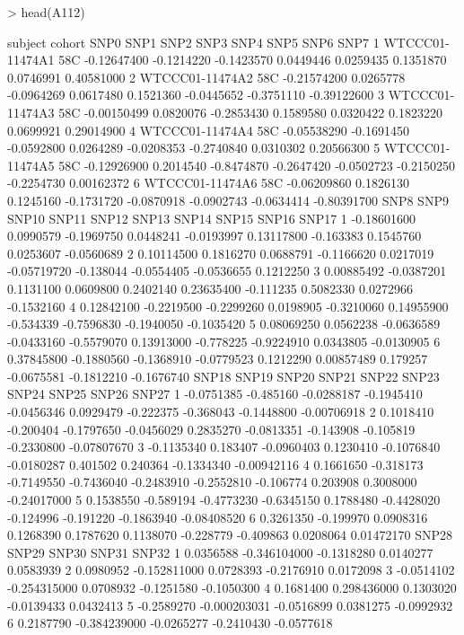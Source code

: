 \documentclass[11pt]{article}
\begin{document}
\begin{Schunk}
\begin{Sinput}
> head(A112)
\end{Sinput}
\end{Schunk}
\tiny
\begin{Schunk}
\begin{Soutput}
          subject cohort        SNP0       SNP1       SNP2       SNP3       SNP4       SNP5       SNP6        SNP7
1 WTCCC01-11474A1    58C -0.12647400 -0.1214220 -0.1423570  0.0449446  0.0259435  0.1351870  0.0746991  0.40581000
2 WTCCC01-11474A2    58C -0.21574200  0.0265778 -0.0964269  0.0617480  0.1521360 -0.0445652 -0.3751110 -0.39122600
3 WTCCC01-11474A3    58C -0.00150499  0.0820076 -0.2853430  0.1589580  0.0320422  0.1823220  0.0699921  0.29014900
4 WTCCC01-11474A4    58C -0.05538290 -0.1691450 -0.0592800  0.0264289 -0.0208353 -0.2740840  0.0310302  0.20566300
5 WTCCC01-11474A5    58C -0.12926900  0.2014540 -0.8474870 -0.2647420 -0.0502723 -0.2150250 -0.2254730  0.00162372
6 WTCCC01-11474A6    58C -0.06209860  0.1826130  0.1245160 -0.1731720 -0.0870918 -0.0902743 -0.0634414 -0.80391700
         SNP8       SNP9      SNP10      SNP11      SNP12       SNP13     SNP14      SNP15      SNP16      SNP17
1 -0.18601600  0.0990579 -0.1969750  0.0448241 -0.0193997  0.13117800 -0.163383  0.1545760  0.0253607 -0.0560689
2  0.10114500  0.1816270  0.0688791 -0.1166620  0.0217019 -0.05719720 -0.138044 -0.0554405 -0.0536655  0.1212250
3  0.00885492 -0.0387201  0.1131100  0.0609800  0.2402140  0.23635400 -0.111235  0.5082330  0.0272966 -0.1532160
4  0.12842100 -0.2219500 -0.2299260  0.0198905 -0.3210060  0.14955900 -0.534339 -0.7596830 -0.1940050 -0.1035420
5  0.08069250  0.0562238 -0.0636589 -0.0433160 -0.5579070  0.13913000 -0.778225 -0.9224910  0.0343805 -0.0130905
6  0.37845800 -0.1880560 -0.1368910 -0.0779523  0.1212290  0.00857489  0.179257 -0.0675581 -0.1812210 -0.1676740
       SNP18     SNP19      SNP20      SNP21      SNP22      SNP23     SNP24     SNP25      SNP26       SNP27
1 -0.0751385 -0.485160 -0.0288187 -0.1945410 -0.0456346  0.0929479 -0.222375 -0.368043 -0.1448800 -0.00706918
2  0.1018410 -0.200404 -0.1797650 -0.0456029  0.2835270 -0.0813351 -0.143908 -0.105819 -0.2330800 -0.07807670
3 -0.1135340  0.183407 -0.0960403  0.1230410 -0.1076840 -0.0180287  0.401502  0.240364 -0.1334340 -0.00942116
4  0.1661650 -0.318173 -0.7149550 -0.7436040 -0.2483910 -0.2552810 -0.106774  0.203908  0.3008000 -0.24017000
5  0.1538550 -0.589194 -0.4773230 -0.6345150  0.1788480 -0.4428020 -0.124996 -0.191220 -0.1863940 -0.08408520
6  0.3261350 -0.199970  0.0908316  0.1268390  0.1787620  0.1138070 -0.228779 -0.409863  0.0208064  0.01472170
       SNP28        SNP29      SNP30      SNP31      SNP32
1  0.0356588 -0.346104000 -0.1318280  0.0140277  0.0583939
2  0.0980952 -0.152811000  0.0728393 -0.2176910  0.0172098
3 -0.0514102 -0.254315000  0.0708932 -0.1251580 -0.1050300
4  0.1681400  0.298436000  0.1303020 -0.0139433  0.0432413
5 -0.2589270 -0.000203031 -0.0516899  0.0381275 -0.0992932
6  0.2187790 -0.384239000 -0.0265277 -0.2410430 -0.0577618
\end{Soutput}
\end{Schunk}
\end{document}
